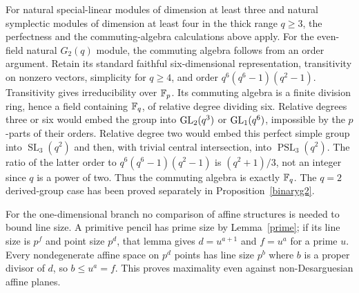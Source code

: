 For natural special-linear modules of dimension at least three and natural
symplectic modules of dimension at least four in the thick range $q\geq3$,
the perfectness and the commuting-algebra calculations above apply.
For the even-field natural $G_2(q)$ module, the commuting algebra follows
from an order argument. Retain its standard faithful six-dimensional
representation, transitivity on nonzero vectors, simplicity for $q\geq4$,
and order $q^6(q^6-1)(q^2-1)$. Transitivity gives irreducibility over
$\mathbb F_p$. Its commuting algebra is a finite division ring, hence a field
containing $\mathbb F_q$, of relative degree dividing six. Relative degrees three
or six would embed the group into $\operatorname{GL}_2(q^3)$ or $\operatorname{GL}_1(q^6)$, impossible
by the $p$-parts of their orders. Relative degree two would embed this
perfect simple group into $\operatorname{SL}_3(q^2)$ and then, with
trivial central intersection, into $\operatorname{PSL}_3(q^2)$.
The ratio of the latter order to $q^6(q^6-1)(q^2-1)$ is
$(q^2+1)/3$, not an integer since $q$ is a power of two. Thus the
commuting algebra is exactly $\mathbb F_q$. The $q=2$ derived-group case
has been proved separately in Proposition~\ref{binaryg2}.

For the one-dimensional branch no comparison of affine structures is
needed to bound line size. A primitive pencil has prime size by
Lemma~\ref{prime}; if its line size is $p^f$ and point size $p^d$, that
lemma gives $d=u^{a+1}$ and $f=u^a$ for a prime $u$. Every nondegenerate
affine space on $p^d$ points has line size $p^b$ where $b$ is a proper
divisor of $d$, so $b\leq u^a=f$. This proves maximality even against
non-Desarguesian affine planes.

